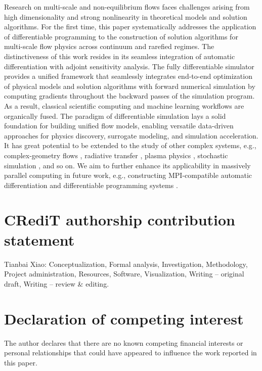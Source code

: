 \documentclass[preprint,3p,12pt,sort&compress]{elsarticle}
\begin{document}
Research on multi-scale and non-equilibrium flows faces challenges arising from high dimensionality and strong nonlinearity in theoretical models and solution algorithms.
For the first time, this paper systematically addresses the application of differentiable programming to the construction of solution algorithms for multi-scale flow physics across continuum and rarefied regimes.
The distinctiveness of this work resides in its seamless integration of automatic differentiation with adjoint sensitivity analysis.
The fully differentiable simulator provides a unified framework that seamlessly integrates end-to-end optimization of physical models and solution algorithms with forward numerical simulation by computing gradients throughout the backward passes of the simulation program.
As a result, classical scientific computing and machine learning workflows are organically fused.
The paradigm of differentiable simulation lays a solid foundation for building unified flow models, enabling versatile data-driven approaches for physics discovery, surrogate modeling, and simulation acceleration.
It has great potential to be extended to the study of other complex systems, e.g., complex-geometry flows \cite{montessori2015lattice,montessori2016effects}, radiative transfer \cite{larsen2013properties,mcclarren2010robust}, plasma physics \cite{blaustein2024structure,von2014vlasiator}, stochastic simulation \cite{hu2017uncertainty,xiao2021stochastic}, and so on.
We aim to further enhance its applicability in massively parallel computing in future work, e.g., constructing MPI-compatible automatic differentiation and differentiable programming systems \cite{moses2022scalable}.

\section*{CRediT authorship contribution statement}

Tianbai Xiao: Conceptualization, Formal analysis, Investigation, Methodology, Project administration, Resources, Software, Visualization, Writing – original draft, Writing – review \& editing.

\section*{Declaration of competing interest}

The author declares that there are no known competing financial interests or personal relationships that could have appeared to influence the work reported in this paper.
\end{document}

